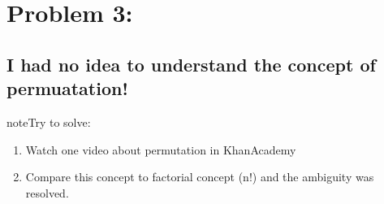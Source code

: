 \documentclass[letterpaper,10pt,english]{sphinxmanual}
\begin{document}
\section{Problem 3:}
\label{\detokenize{index:problem-3}}

\subsection{I had no idea to understand the concept of permuatation!}
\label{\detokenize{index:i-had-no-idea-to-understand-the-concept-of-permuatation}}
\begin{sphinxadmonition}{note}{Try to solve:}
\begin{enumerate}
%
\item {} 
\sphinxAtStartPar
Watch one video about permutation in KhanAcademy

\item {} 
\sphinxAtStartPar
Compare this concept to factorial concept (n!) and the ambiguity was resolved.

\end{enumerate}
\end{sphinxadmonition}



\renewcommand{\indexname}{Index}
\printindex
\end{document}
